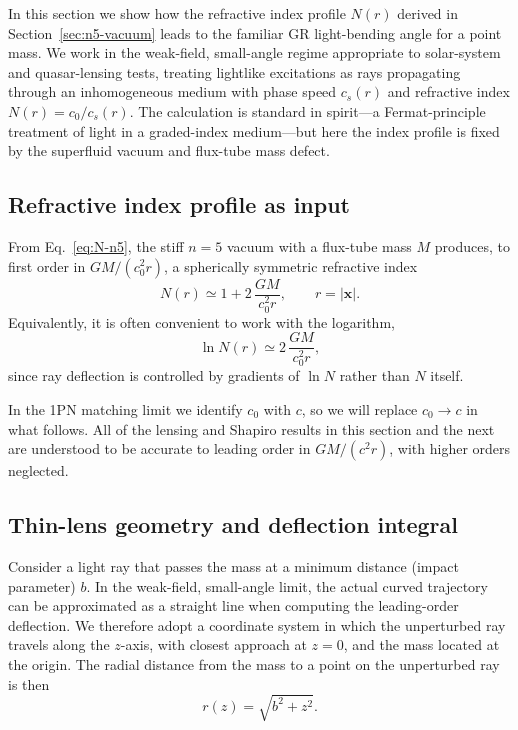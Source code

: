 \documentclass[11pt]{article}
\begin{document}
In this section we show how the refractive index profile $N(r)$ derived in
Section~\ref{sec:n5-vacuum} leads to the familiar GR light-bending angle
for a point mass.
We work in the weak-field, small-angle regime appropriate to solar-system
and quasar-lensing tests, treating lightlike excitations as rays propagating
through an inhomogeneous medium with phase speed $c_s(r)$ and refractive
index $N(r) = c_0 / c_s(r)$.
The calculation is standard in spirit---a Fermat-principle treatment of
light in a graded-index medium---but here the index profile is fixed by the
superfluid vacuum and flux-tube mass defect.


\subsection{Refractive index profile as input}
\label{subsec:lensing-N}

From Eq.~\eqref{eq:N-n5}, the stiff $n=5$ vacuum with a flux-tube mass $M$
produces, to first order in $GM/(c_0^2 r)$, a spherically symmetric
refractive index
\begin{equation}
  N(r)
  \simeq 1 + 2\,\frac{GM}{c_0^2 r},
  \qquad r = |\mathbf{x}|.
  \label{eq:lensing-N}
\end{equation}
Equivalently, it is often convenient to work with the logarithm,
\begin{equation}
  \ln N(r)
  \simeq 2\,\frac{GM}{c_0^2 r},
  \label{eq:lensing-lnN}
\end{equation}
since ray deflection is controlled by gradients of $\ln N$ rather than $N$
itself.

In the 1PN matching limit we identify $c_0$ with $c$, so we will replace
$c_0 \to c$ in what follows.
All of the lensing and Shapiro results in this section and the next are
understood to be accurate to leading order in $GM/(c^2 r)$, with higher
orders neglected.


\subsection{Thin-lens geometry and deflection integral}
\label{subsec:lensing-geometry}

Consider a light ray that passes the mass at a minimum distance (impact
parameter) $b$.
In the weak-field, small-angle limit, the actual curved trajectory can be
approximated as a straight line when computing the leading-order deflection.
We therefore adopt a coordinate system in which the unperturbed ray travels
along the $z$-axis, with closest approach at $z=0$, and the mass located at
the origin.
The radial distance from the mass to a point on the unperturbed ray is then
\begin{equation}
  r(z) = \sqrt{b^2 + z^2}.
\end{equation}
\end{document}
